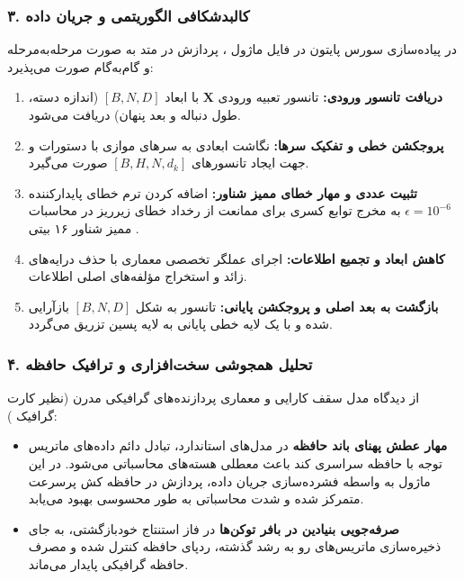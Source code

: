 \subsubsection*{۳. کالبدشکافی الگوریتمی و جریان داده }
در پیاده‌سازی سورس پایتون در فایل ماژول ، پردازش در متد  به صورت مرحله‌به‌مرحله و گام‌به‌گام صورت می‌پذیرد:
\begin{enumerate}
\item \textbf{دریافت تانسور ورودی:} تانسور تعبیه ورودی $\mathbf{X}$ با ابعاد $[B, N, D]$ (اندازه دسته، طول دنباله و بعد پنهان) دریافت می‌شود.
\item \textbf{پروجکشن خطی و تفکیک سرها:} نگاشت ابعادی به سرهای موازی با دستورات  و  جهت ایجاد تانسورهای $[B, H, N, d_k]$ صورت می‌گیرد.
\item \textbf{تثبیت عددی و مهار خطای ممیز شناور:} اضافه کردن ترم خطای پایدارکننده $\epsilon = 10^{-6}$ به مخرج توابع کسری برای ممانعت از رخداد خطای زیرریز  در محاسبات ممیز شناور ۱۶ بیتی .
\item \textbf{کاهش ابعاد و تجمیع اطلاعات:} اجرای عملگر تخصصی معماری با حذف درایه‌های زائد و استخراج مؤلفه‌های اصلی اطلاعات.
\item \textbf{بازگشت به بعد اصلی و پروجکشن پایانی:} تانسور به شکل $[B, N, D]$ بازآرایی شده و با یک لایه خطی پایانی به لایه پسین تزریق می‌گردد.
\end{enumerate}

\subsubsection*{۴. تحلیل همجوشی سخت‌افزاری و ترافیک حافظه }
از دیدگاه مدل سقف کارایی  و معماری پردازنده‌های گرافیکی مدرن (نظیر کارت گرافیک ):
\begin{itemize}
\item \textbf{مهار عطش پهنای باند حافظه } \rl{:}  در مدل‌های استاندارد، تبادل دائم داده‌های ماتریس توجه با حافظه سراسری کند  باعث معطلی هسته‌های محاسباتی می‌شود. در این ماژول به واسطه فشرده‌سازی جریان داده، پردازش در حافظه کش پرسرعت  متمرکز شده و شدت محاسباتی  به طور محسوسی بهبود می‌یابد.
\item \textbf{صرفه‌جویی بنیادین در بافر توکن‌ها } \rl{:}  در فاز استنتاج خودبازگشتی، به جای ذخیره‌سازی ماتریس‌های رو به رشد گذشته، ردپای حافظه کنترل شده و مصرف حافظه گرافیکی پایدار می‌ماند.
\end{itemize}

